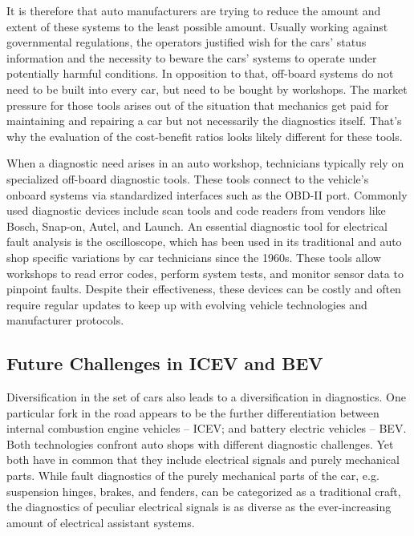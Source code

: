 It is therefore that auto manufacturers are trying to reduce the amount and extent of these systems to the least possible amount. 
Usually working against governmental regulations, the operators justified wish for the cars’ status information and the necessity to beware the cars’ systems to operate under potentially harmful conditions. 
In opposition to that, off-board systems do not need to be built into every car, but need to be bought by workshops. 
The market pressure for those tools arises out of the situation that mechanics get paid for maintaining and repairing a car but not necessarily the diagnostics itself. 
That’s why the evaluation of the cost-benefit ratios looks likely different for these tools.

When a diagnostic need arises in an auto workshop, technicians typically rely on specialized off-board diagnostic tools. 
These tools connect to the vehicle’s onboard systems via standardized interfaces such as the OBD-II port. 
Commonly used diagnostic devices include scan tools and code readers from vendors like Bosch, Snap-on, Autel, and Launch. 
An essential diagnostic tool for electrical fault analysis is the oscilloscope, which has been used in its traditional and auto shop specific variations by car technicians since the 1960s.
These tools allow workshops to read error codes, perform system tests, and monitor sensor data to pinpoint faults. 
Despite their effectiveness, these devices can be costly and often require regular updates to keep up with evolving vehicle technologies and manufacturer protocols.

\subsection{Future Challenges in ICEV and BEV}
Diversification in the set of cars also leads to a diversification in diagnostics. 
One particular fork in the road appears to be the further differentiation between internal combustion engine vehicles – ICEV; and battery electric vehicles – BEV. 
Both technologies confront auto shops with different diagnostic challenges. 
Yet both have in common that they include electrical signals and purely mechanical parts. 
While fault diagnostics of the purely mechanical parts of the car, e.g. suspension hinges, brakes, and fenders, can be categorized as a traditional craft, 
the diagnostics of peculiar electrical signals is as diverse as the ever-increasing amount of electrical assistant systems. 

